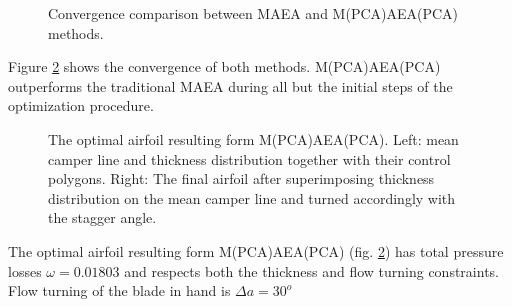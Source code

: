 \begin{figure}[h!]
\begin{minipage}[b]{1\linewidth}
 \centering
\end{minipage}
\caption{Convergence comparison between MAEA and M(PCA)AEA(PCA) methods.} 
\label{PCADrelaRes}
\end{figure}

Figure \ref{PCADrelaRes} shows the convergence of both methods. M(PCA)AEA(PCA) outperforms the traditional MAEA during all but the initial steps of the optimization procedure. 

\begin{figure}[h!]
\begin{minipage}[b]{1\linewidth}
 \centering
\end{minipage}
\caption{The optimal airfoil resulting form M(PCA)AEA(PCA). Left: mean camper line and thickness distribution together with their control polygons. Right: The final airfoil after superimposing thickness distribution on the mean camper line and turned accordingly with the stagger angle.} 
\label{PCADrelaRes}
\end{figure}

The optimal airfoil resulting form M(PCA)AEA(PCA) (fig. \ref{PCADrelaRes}) has total pressure losses $\omega=0.01803$ and respects both the thickness and flow turning constraints.  Flow turning of the blade in hand is $\Delta a=30^o$

